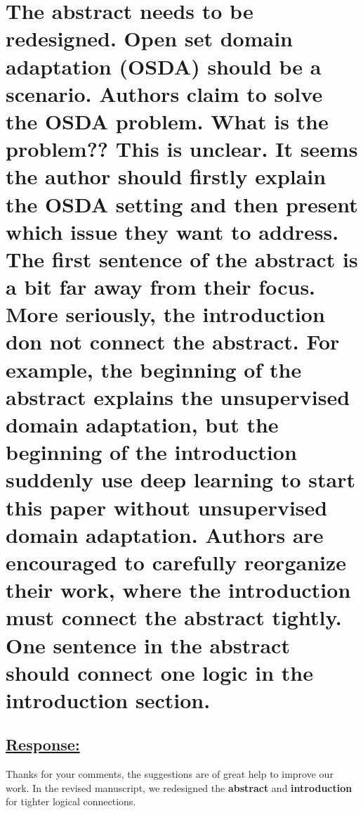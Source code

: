 \section{The abstract needs to be redesigned.
    Open set domain adaptation (OSDA) should be a scenario.
    Authors claim to solve the OSDA problem. What is the problem?? This is unclear.
    It seems the author should firstly explain the OSDA setting and then present which issue they want to address. The first sentence of the abstract is a bit far away from their focus.
    More seriously, the introduction don not connect the abstract.
    For example, the beginning of the abstract explains the unsupervised domain adaptation, but the beginning of the introduction suddenly use deep learning to start this paper without unsupervised domain adaptation.
    Authors are encouraged to carefully reorganize their work, where the introduction must connect the abstract tightly.
    One sentence in the abstract should connect one logic in the introduction section.}
\subsection*{\underline{\textbf{Response:}}}


Thanks for your comments, the suggestions are of great help to improve our work.
In the revised manuscript, we redesigned the \textbf{abstract} and \textbf{introduction} for tighter logical connections.

